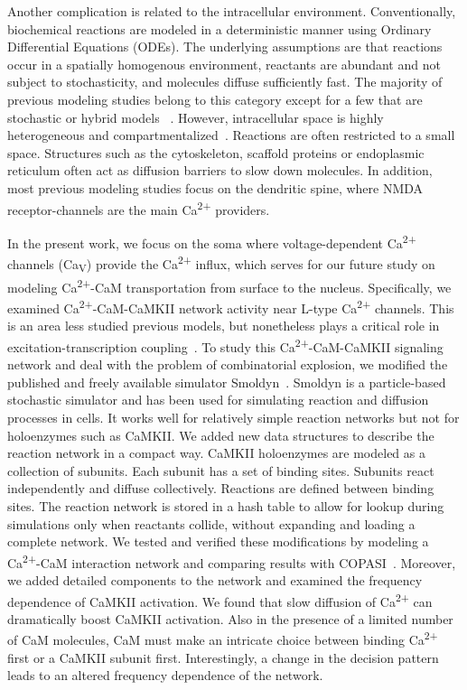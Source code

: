 \documentclass[10pt,letterpaper]{article}
\begin{document}
Another complication is related to the intracellular environment. Conventionally, biochemical reactions are modeled in a deterministic manner using Ordinary Differential Equations (ODEs). The underlying assumptions are that reactions occur in a spatially homogenous environment, reactants are abundant and not subject to stochasticity, and molecules diffuse sufficiently fast. The majority of previous modeling studies belong to this category except for a few that are stochastic or hybrid models ~\cite{Bhalla:2004cu, Zeng:2010bq, Holmes:2000uk}. However, intracellular space is highly heterogeneous and compartmentalized~\cite{LubyPhelps:2000uj,Dix:2008gy}. Reactions are often restricted to a small space. Structures such as the cytoskeleton, scaffold proteins or endoplasmic reticulum often act as diffusion barriers to slow down molecules. In addition, most previous modeling studies focus on the dendritic spine, where NMDA receptor-channels are the main Ca\textsuperscript{2+} providers. 

In the present work, we focus on the soma where voltage-dependent Ca\textsuperscript{2+} channels (Ca\textsubscript{V}) provide the Ca\textsuperscript{2+} influx, which serves for our future study on modeling Ca\textsuperscript{2+}-CaM transportation from surface to the nucleus. Specifically, we examined Ca\textsuperscript{2+}-CaM-CaMKII network activity near L-type Ca\textsuperscript{2+} channels. This is an area less studied previous models, but nonetheless plays a critical role in excitation-transcription coupling~\cite{Ma:2015bg,Li:2016cq}. To study this Ca\textsuperscript{2+}-CaM-CaMKII signaling network and deal with the problem of combinatorial explosion, we modified the published and freely available simulator Smoldyn~\cite{Andrews:2004fs}. Smoldyn is a particle-based stochastic simulator and has been used for simulating reaction and diffusion processes in cells. It works well for relatively simple reaction networks but not for holoenzymes such as CaMKII. We added new data structures to describe the reaction network in a compact way. CaMKII holoenzymes are modeled as a collection of subunits. Each subunit has a set of binding sites. Subunits react independently and diffuse collectively. Reactions are defined between binding sites. The reaction network is stored in a hash table to allow for lookup during simulations only when reactants collide, without expanding and loading a complete network. We tested and verified these modifications by modeling a Ca\textsuperscript{2+}-CaM interaction network and comparing results with COPASI~\cite{Hoops:2006gy}. Moreover, we added detailed components to the network and examined the frequency dependence of CaMKII activation. We found that slow diffusion of Ca\textsuperscript{2+} can dramatically boost CaMKII activation. Also in the presence of a limited number of CaM molecules, CaM must make an intricate choice between binding Ca\textsuperscript{2+} first or a CaMKII subunit first. Interestingly, a change in the decision pattern leads to an altered frequency dependence of the network. 
\end{document}
